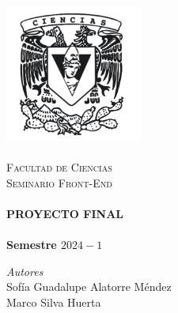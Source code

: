 \begin{titlepage}
\center \newcommand{\HRule}{\rule{\linewidth}{0.5mm}} 

\includegraphics[width=4.5cm]{IMA/Ciencias.png} \\ 

\quad \\[1.5cm]

\textsc{\Large Facultad de Ciencias}\\[0.5cm] 
\textsc{\Large Seminario Front-End}\\[0.5cm] 
\makeatletter
    \HRule\\ [0.4cm]
        { \huge \bfseries PROYECTO FINAL}\\
    \HRule\\ [0.4cm]

\large\textbf{Semestre $2024-1$}\\

\vspace{20mm}
\begin{minipage}{0.4\textwidth}
    \begin{flushright} \large
    \centering
        \emph{Autores} \\
        \vspace{3mm}
        Sofía Guadalupe Alatorre Méndez\\
        \vspace{3mm}
        Marco Silva Huerta
    \end{flushright}
\end{minipage}\\[2.4cm]


\end{titlepage}

